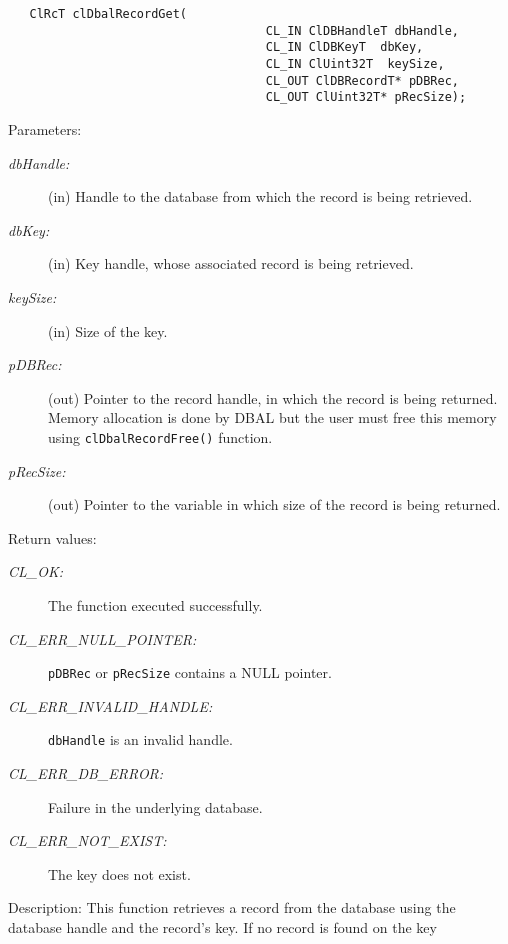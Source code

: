\begin{flushleft}
\begin{Desc}
\footnotesize\begin{verbatim}   ClRcT clDbalRecordGet(
                                	CL_IN ClDBHandleT dbHandle,
                                	CL_IN ClDBKeyT  dbKey,
                                	CL_IN ClUint32T  keySize,
                                	CL_OUT ClDBRecordT* pDBRec,
                                	CL_OUT ClUint32T* pRecSize);
\end{verbatim}
\normalsize
\end{Desc}
\begin{Desc}
\item[Parameters:]
\begin{description}
\item[{\em db\-Handle:}](in) Handle to the database from which the record is being retrieved. 
\item[{\em db\-Key:}](in) Key handle, whose associated 
record is being retrieved. \item[{\em key\-Size:}](in) Size of the key. 
\item[{\em p\-DBRec:}](out) Pointer to the record handle, in which the record is 
being returned. Memory allocation is done by DBAL but the user must free this memory using {\tt{cl\-Dbal\-Record\-Free()}} function. 
\item[{\em p\-Rec\-Size:}](out) Pointer to the variable in which size of the record is being returned.\end{description}
\end{Desc}
\begin{Desc}
\item[Return values:]
\begin{description}
\item[{\em CL\_\-OK:}]The function executed successfully. 
\item[{\em CL\_\-ERR\_\-NULL\_\-POINTER:}]{\tt{pDBRec}} or {\tt{pRecSize}} contains a NULL pointer. 
\item[{\em CL\_\-ERR\_\-INVALID\_\-HANDLE:}]{\tt{dbHandle}} is an invalid handle. 
\item[{\em CL\_\-ERR\_\-DB\_\-ERROR:}]Failure in the underlying database. 
\item[{\em CL\_\-ERR\_\-NOT\_\-EXIST:}]The key does not exist.\end{description}
\end{Desc}
\begin{Desc}
\item[Description:]This function retrieves a record from the database using the database handle and the record's key. If no record is found on the key 

\end{Desc}
\end{flushleft}
